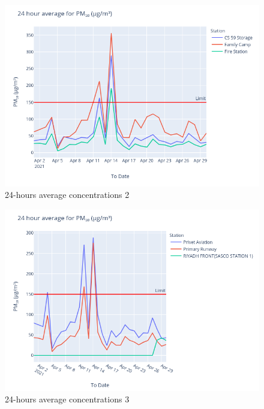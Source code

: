 \documentclass[12pt, oneside]{book}
\begin{document}
{
{\begin{figure}[H]
\centering
\includegraphics[width=\textwidth]{image199}
\caption{24-hours average  concentrations 2}\label{image199}
\end{figure}}{}


{\begin{figure}[H]
\centering
\includegraphics[width=\textwidth]{image211}
\caption{24-hours average  concentrations 3}\label{image211}
\end{figure}}{}

}
\end{document}
